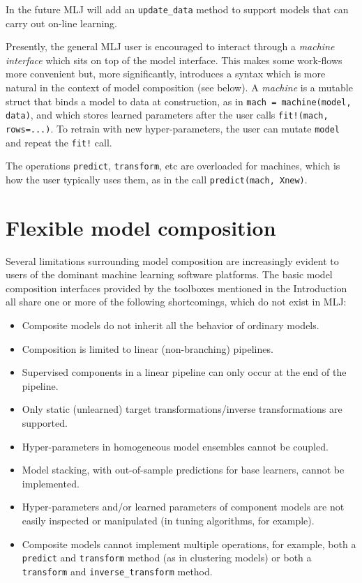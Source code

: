 \documentclass{article}
\begin{document}
In the future MLJ will add an \texttt{update\_data} method to support
models that can carry out on-line learning.

Presently, the general MLJ user is encouraged to interact through a
\textit{machine interface} which sits on top of the model
interface. This makes some work-flows more convenient but, more
significantly, introduces a syntax which is more natural in the
context of model composition (see below). A \textit{machine} is a
mutable struct that binds a model to data at construction, as in
\texttt{mach = machine(model, data)}, and which stores learned
parameters after the user calls \texttt{fit!(mach, rows=...)}. To
retrain with new hyper-parameters, the user can mutate \texttt{model}
and repeat the \texttt{fit!} call.

The operations \texttt{predict}, \texttt{transform}, etc are
overloaded for machines, which is how the user typically uses them, as
in the call \texttt{predict(mach, Xnew)}.

\section{Flexible model composition}

Several limitations surrounding model composition are increasingly
evident to users of the dominant machine learning software
platforms. The basic model composition interfaces provided by the
toolboxes mentioned in the Introduction all share one or more of the
following shortcomings, which do not exist in MLJ:

\begin{itemize}

\item Composite models do not inherit all the behavior of ordinary
  models.

\item Composition is limited to linear (non-branching) pipelines.

\item Supervised components in a linear pipeline can only occur at the
  end of the pipeline.

\item Only static (unlearned) target transformations/inverse
  transformations are supported.

\item Hyper-parameters in homogeneous model ensembles cannot be
  coupled.

\item Model stacking, with out-of-sample predictions for base
  learners, cannot be implemented.

\item Hyper-parameters and/or learned parameters of component models
  are not easily inspected or manipulated (in tuning algorithms, for
  example).

\item Composite models cannot implement multiple operations, for
  example, both a \texttt{predict} and \texttt{transform} method (as
  in clustering models) or both a \texttt{transform} and
  \texttt{inverse\_transform} method.

\end{itemize}
\end{document}
